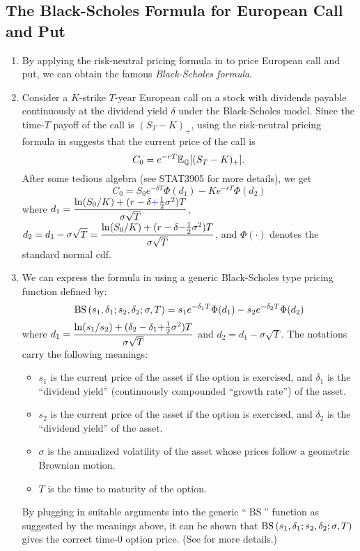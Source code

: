 \subsection{The Black-Scholes Formula for European Call and Put}
\begin{enumerate}
\item By applying the risk-neutral pricing formula in
 to price European call and put, we can obtain
the famous \emph{Black-Scholes formula}.

\item \label{it:bs-call-fmla}
 Consider a \(K\)-strike \(T\)-year European call on a stock 
with dividends payable continuously at the dividend yield \(\delta\) under the
Black-Scholes model. Since the time-\(T\) payoff of the call is
\((S_T-K)_{+}\), using the risk-neutral pricing formula in
 suggests that the current price of the call
is
\[
C_0=e^{-rT}\mathbb{E}_{\mathbb{Q}}\qty[(S_T-K)_{+}].
\]
After some tedious algebra (see STAT3905 for more details), we get
\[
C_0=\boxed{S_0e^{-\delta T}\Phi(d_1)-Ke^{-rT}\Phi(d_2)}
\]
where \(\displaystyle
d_1=\frac{\ln(S_0/K)+(r-\delta{\color{blue}+}\frac{1}{2}\sigma^2)T}{\sigma\sqrt{T}}\),
\(\displaystyle
d_2=d_1-\sigma\sqrt{T}=\frac{\ln(S_0/K)+(r-\delta{\color{blue}-}\frac{1}{2}\sigma^2)T}{\sigma\sqrt{T}}\),
and \(\Phi(\cdot)\) denotes the standard normal cdf.

\item \label{it:bs-pricing-fun}
We can express the formula in  using a generic
Black-Scholes type pricing function defined by:
\[
\operatorname{BS}\qty(s_1,\delta_1;s_2,\delta_2;\sigma,T)=s_1e^{-\delta_1 T}\Phi(d_1)-s_2e^{-\delta_2 T}\Phi(d_2)
\]
where \(\displaystyle
d_1=\frac{\ln(s_1/s_2)+(\delta_2-\delta_1{\color{blue}+}\frac{1}{2}\sigma^2)T}{\sigma\sqrt{T}}\)
and \(\displaystyle d_2=d_1-\sigma\sqrt{T}\). The notations carry the following
meanings:
\begin{itemize}
\item \(s_1\) is the current price of the asset  if the option is
exercised, and \(\delta_1\) is the ``dividend yield'' (continuously compounded
``growth rate'') of the asset.
\item \(s_2\) is the current price of the asset  if the option is
exercised, and \(\delta_2\) is the ``dividend yield'' of the asset.
\item \(\sigma\) is the annualized volatility of the asset whose prices follow
a geometric Brownian motion.
\item \(T\) is the time to maturity of the option.
\end{itemize}
By plugging in suitable arguments into the generic ``\(\operatorname{BS}\)''
function as suggested by the meanings above, it can be shown that
\(\operatorname{BS}\qty(s_1,\delta_1;s_2,\delta_2;\sigma,T)\) gives the correct time-0 option
price. (See  for more details.)


\end{enumerate}
